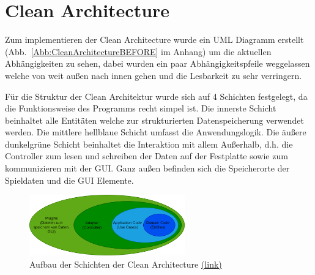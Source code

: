 \chapter{Clean Architecture}

Zum implementieren der Clean Architecture wurde ein UML Diagramm erstellt (Abb.~\ref{Abb:CleanArchitectureBEFORE} im Anhang) um die aktuellen Abhängigkeiten zu sehen, dabei wurden ein paar Abhängigkeitspfeile weggelassen welche von weit außen nach innen gehen und die Lesbarkeit zu sehr verringern. 


Für die Struktur der Clean Architektur wurde sich auf 4 Schichten festgelegt, da die Funktionsweise des Programms recht simpel ist. Die innerste Schicht beinhaltet alle Entitäten welche zur strukturierten Datenspeicherung verwendet werden. Die mittlere hellblaue Schicht umfasst die Anwendungslogik. Die äußere dunkelgrüne Schicht beinhaltet die Interaktion mit allem Außerhalb, d.h. die Controller zum lesen und schreiben der Daten auf der Festplatte sowie zum kommunizieren mit der GUI. Ganz außen befinden sich die Speicherorte der Spieldaten und die GUI Elemente. 


\begin{figure}[!ht]
  \centering
  \includegraphics[width=0.6\textwidth]{Bilder/ArchitekturSchichten.PNG}
  \caption[Aufbau der Schichten der Clean Architecture]{Aufbau der Schichten der Clean Architecture \href{https://github.com/EinToni/WortfinderDoku/blob/main/Bilder/ArchitekturSchichten.png}{(link)}}
  \label{Abb:ArchitekturSchichten}
\end{figure}


